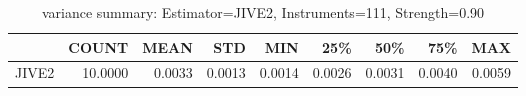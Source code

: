 \begin{table}[ht]
\centering
\caption{variance summary: Estimator=JIVE2, Instruments=111, Strength=0.90}
\begin{tabular}{lrrrrrrrr}
\toprule
 & COUNT & MEAN & STD & MIN & 25\% & 50\% & 75\% & MAX \\
\midrule
JIVE2 & 10.0000 & 0.0033 & 0.0013 & 0.0014 & 0.0026 & 0.0031 & 0.0040 & 0.0059 \\
\bottomrule
\end{tabular}
\end{table}
